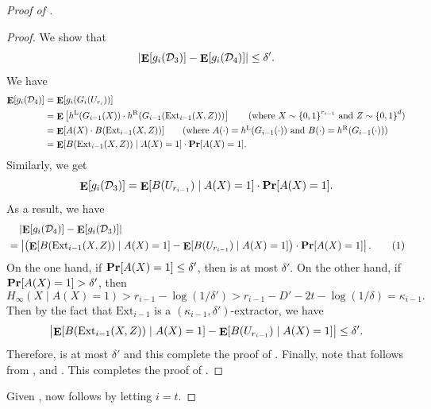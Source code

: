 \documentclass[10pt,a4paper]{article}
\DeclareMathOperator*\Exp{{\bf E}}
\DeclareMathOperator*\Prob{{\bf Pr}}
\newcommand{\bool}{\left\{0,1\right\}}
\newcommand{\numberthis}{\addtocounter{equation}{1}\tag{\theequation}}
\newcommand{\given}{\mid}
\newcommand{\LH}[1]{#1^{\mathrm{L}}}
\newcommand{\RH}[1]{#1^{\mathrm{R}}}
\newcommand{\cprn}[1]{\!\left(#1\right)}
\begin{document}
\begin{proof}[Proof of ]
\begin{proof}
	    	We show that
            \begin{equation}\label{eq:prg-lc-triangle-3}
				\left|\Exp[g_i(\mathcal{D}_3)]-\Exp[g_i(\mathcal{D}_4)]\right| \leq \delta'.
			\end{equation}
	    	We have
	    	\begin{align*}
	    		\Exp[g_i(\mathcal{D}_4)]&=\Exp[g_i(G_i(U_{r_i}))]\\
	    		&=\Exp\left[\LH{h}(G_{i-1}(X))\cdot \RH{h}(G_{i-1}(\mathrm{Ext}_{i-1}(X,Z)))\right]
	    		\tag{where $X\sim\bool^{r_{i-1}}$ and $Z\sim\bool^{d}$}\\
	    		&=\Exp[A(X)\cdot B(\mathrm{Ext}_{i-1}(X,Z))]
	    		\tag{where $A(\cdot)= \LH{h}(G_{i-1}(\cdot))$  and $B(\cdot)= \RH{h}(G_{i-1}(\cdot))$}\\
	    		&=\Exp[B(\mathrm{Ext}_{i-1}(X,Z))\given A(X)=1]\cdot\Prob[A(X)=1].
	    	\end{align*}
	    	Similarly, we get
	    	\[
	    		\Exp[g_i(\mathcal{D}_3)]=\Exp[B(U_{r_{i-1}})\given A(X)=1]\cdot\Prob[A(X)=1].
	    	\]
	    	As a result, we have
	    	\begin{align*}\label{eq:prg-lc-triangle-3.1}
	    		&\quad\left|\Exp[g_i(\mathcal{D}_4)]-\Exp[g_i(\mathcal{D}_3)]\right|\\
	    		&=\left|\left(\Exp[B(\mathrm{Ext}_{i-1}(X,Z))\given A(X)=1]-\Exp[B(U_{r_{i-1}})\given A(X)=1]\right)\cdot\Prob[A(X)=1]\right|.
	    		\numberthis
	    	\end{align*}
		    On the one hand, if $\Prob[A(X)=1]\leq \delta'$, then  is at most $\delta'$. On the other hand, if $\Prob[A(X)=1]> \delta'$, then
	        \[
	        	H_{\infty}\cprn{X\given A(X)=1} > r_{i-1}-\log(1/\delta')> r_{i-1}-D'-2t -\log(1/\delta)=\kappa_{i-1}.
	        \]
	        Then by the fact that $\mathrm{Ext}_{i-1}$ is a $(\kappa_{i-1},\delta')$-extractor, we have
	        \[
	            \left|\Exp[B(\mathrm{Ext}_{i-1}(X,Z))\given A(X)=1] - \Exp[B(U_{r_{i-1}})\given A(X)=1]\right| \leq \delta'.
	        \]
	        Therefore,  is at most $\delta'$ and this complete the proof of . Finally, note that  follows from ,  and . This completes the proof of .
	    \end{proof}
	    
	    Given ,  now follows by letting $i=t$.
	\end{proof}
\end{document}
